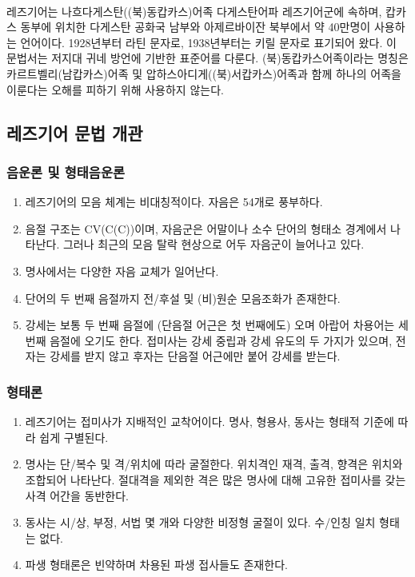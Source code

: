 \paragraph{} 레즈기어는 나흐다게스탄((북)동캅카스)어족 다게스탄어파 레즈기어군에 속하며, 캅카스 동부에 위치한 다게스탄 공화국 남부와 아제르바이잔 북부에서 약 40만명이 사용하는 언어이다. 1928년부터 라틴 문자로, 1938년부터는 키릴 문자로 표기되어 왔다. 이 문법서는 저지대 귀네 방언에 기반한 표준어를 다룬다. (북)동캅카스어족이라는 명칭은 카르트벨리(남캅카스)어족 및 압하스아디게((북)서캅카스)어족과 함께 하나의 어족을 이룬다는 오해를 피하기 위해 사용하지 않는다.
\subsection{레즈기어 문법 개관}
\subsubsection{음운론 및 형태음운론}
\begin{enumerate}
	\item 레즈기어의 모음 체계는 비대칭적이다. 자음은 54개로 풍부하다.
	\item 음절 구조는 CV(C(C))이며, 자음군은 어말이나 소수 단어의 형태소 경계에서 나타난다. 그러나 최근의 모음 탈락 현상으로 어두 자음군이 늘어나고 있다.
	\item 명사에서는 다양한 자음 교체가 일어난다.
	\item 단어의 두 번째 음절까지 전/후설 및 (비)원순 모음조화가 존재한다.
	\item 강세는 보통 두 번째 음절에 (단음절 어근은 첫 번째에도) 오며 아랍어 차용어는 세 번째 음절에 오기도 한다. 접미사는 강세 중립과 강세 유도의 두 가지가 있으며, 전자는 강세를 받지 않고 후자는 단음절 어근에만 붙어 강세를 받는다.
\end{enumerate}
\subsubsection{형태론}
\begin{enumerate}
	\item 레즈기어는 접미사가 지배적인 교착어이다. 명사, 형용사, 동사는 형태적 기준에 따라 쉽게 구별된다.
	\item 명사는 단/복수 및 격/위치에 따라 굴절한다. 위치격인 재격, 출격, 향격은 위치와 조합되어 나타난다. 절대격을 제외한 격은 많은 명사에 대해 고유한 접미사를 갖는 사격 어간을 동반한다.
	\item 동사는 시/상, 부정, 서법 몇 개와 다양한 비정형 굴절이 있다. 수/인칭 일치 형태는 없다.
	\item 파생 형태론은 빈약하며 차용된 파생 접사들도 존재한다.
\end{enumerate}

